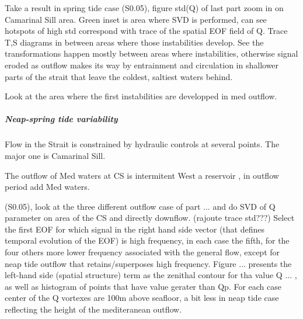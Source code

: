 
Take a result in spring tide case (S0.05), figure std(Q) of last part zoom in on Camarinal Sill area. Green inset is area where SVD is performed, can see hotspots of high std correspond with trace of the spatial EOF field of Q. Trace T,S diagrams in between areas where those instabilities develop. See the transformations happen mostly between areas where instabilities, otherwise signal eroded as outflow makes its way by entrainment and circulation in shallower parts of the strait that leave the coldest, saltiest waters behind.




Look at the area where the first instabilities are developped in med outflow.

\subparagraph{Neap-spring tide variability}


Flow in the Strait is constrained by hydraulic controls at several points. The major one is Camarinal Sill.

The outflow of Med waters at CS is intermitent
West a reservoir , in outflow period add Med waters.





(S0.05), look at the three different outflow case of part ... and do SVD of Q parameter on area of the CS and directly downflow. (rajoute trace std???) Select the first EOF for which signal in the right hand side vector (that defines temporal evolution of the EOF) is high frequency, in each case the fifth, for the four others more lower frequency associated with the general flow, except for neap tide outflow that retains/superposes high frequency. Figure ... presents the left-hand side (spatial structure) term as the zenithal contour for tha value Q ... , as well as histogram of points that have value gerater than Qp. For each case center of the Q vortexes are 100m above seafloor, a bit less in neap tide case reflecting the height of the mediteranean outflow.


